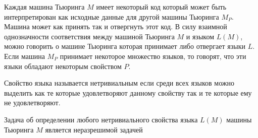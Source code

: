 Каждая машина Тьюринга $M$ имеет некоторый код который может быть 
интерпретирован как исходные данные для другой машины Тьюринга $M_P$. 
Машина может как принять так и отвергнуть этот код. В силу взаимной
однозначности соответствия между машиной Тьюринга $M$ и языком 
$L\left(M\right)$, можно говорить о машине Тьюринга
которая принимает либо отвергает языки $L$. Если машина $M_P$
принимает некоторое множество языков, то говорят, 
что эти языки обладают некоторым свойством $P$.

\begin{definition}
Свойство языка называется нетривиальным если среди всех языков можно
выделить как те которые удовлетворяют данному свойству так и те
которые ему не удовлетворяют.
\end{definition}

\begin{theorem}
Задача об определении любого нетривиального свойства языка 
$L\left(M\right)$ машины Тьюринга $M$ является неразрешимой задачей
\end{theorem}

